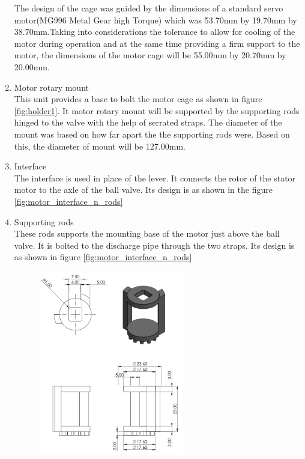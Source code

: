 \begin{enumerate}
\begin{figure}[p]
    \end{figure}
    The design of the cage was guided by the dimensions of a standard servo motor(MG996 Metal Gear high Torque) which was 53.70mm by 19.70mm by 38.70mm.Taking into considerations the tolerance to allow for cooling of the motor during operation  and at the same time providing a firm support to the motor, the dimensions of the motor cage will be  55.00mm by 20.70mm by 20.00mm.
    \item Motor rotary mount\\
    This unit provides a base to bolt the motor cage as shown in figure \ref{fig:holder1}. It motor rotary mount will be supported by the supporting rods hinged to the valve with the help of serrated straps. The diameter of the mount was based on how far apart the the supporting rods were. Based on this, the diameter of mount will be 127.00mm.
    \item Interface \\
    The interface is used in place of the lever. It connects the rotor of the stator motor to the axle of the ball valve. Its design is as shown in the figure \ref{fig:motor_interface_n_rods}
    \item Supporting rods\\
    These rods supports the mounting base of the motor just above the ball valve. It is bolted to the discharge pipe through the two straps. Its design is as shown in figure \ref{fig:motor_interface_n_rods}
    \begin{figure}[p]
        \centering
        \includegraphics[width=0.6\textwidth, height=0.5\textheight]{Figures/interface.png}

\end{figure}
\end{enumerate}
